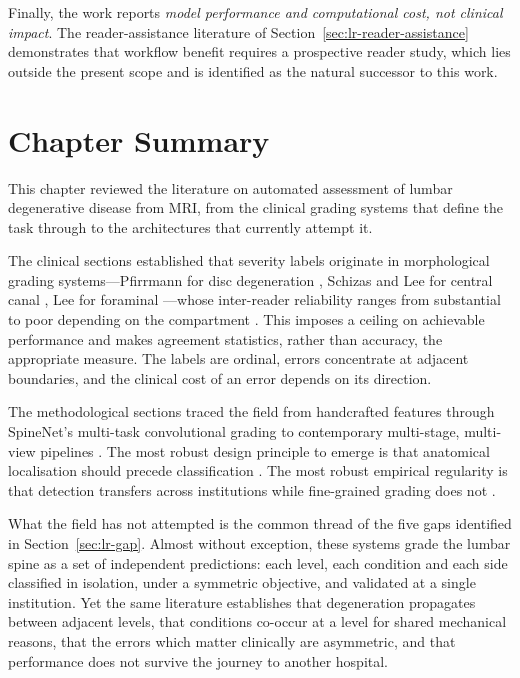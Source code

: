Finally, the work reports \emph{model performance and computational cost, not
clinical impact}. The reader-assistance literature of
Section~\ref{sec:lr-reader-assistance} \cite{lim2022improved,gao2022automatic}
demonstrates that workflow benefit requires a prospective reader study, which
lies outside the present scope and is identified as the natural successor to
this work.

\section{Chapter Summary}
\label{sec:lr-summary}

This chapter reviewed the literature on automated assessment of lumbar
degenerative disease from MRI, from the clinical grading systems that define the
task through to the architectures that currently attempt it.

The clinical sections established that severity labels originate in
morphological grading systems---Pfirrmann for disc degeneration
\cite{pfirrmann2001magnetic}, Schizas and Lee for central canal
\cite{schizas2010qualitative,lee2011a}, Lee for foraminal
\cite{lee2010a}---whose inter-reader reliability ranges from substantial to poor
depending on the compartment \cite{lurie2008reliability}. This imposes a ceiling
on achievable performance and makes agreement statistics, rather than accuracy,
the appropriate measure. The labels are ordinal, errors concentrate at adjacent
boundaries, and the clinical cost of an error depends on its direction.

The methodological sections traced the field from handcrafted features through
SpineNet's multi-task convolutional grading \cite{jamaludin2017spinenet} to
contemporary multi-stage, multi-view pipelines \cite{batra2025mscan}. The most
robust design principle to emerge is that anatomical localisation should precede
classification \cite{lu2018deepspine,kowlagi2022a}. The most robust empirical
regularity is that detection transfers across institutions while fine-grained
grading does not \cite{zhang2023deep,wu2026external}.

What the field has not attempted is the common thread of the five gaps
identified in Section~\ref{sec:lr-gap}. Almost without exception, these systems
grade the lumbar spine as a set of independent predictions: each level, each
condition and each side classified in isolation, under a symmetric objective,
and validated at a single institution. Yet the same literature establishes that
degeneration propagates between adjacent levels, that conditions co-occur at a
level for shared mechanical reasons, that the errors which matter clinically are
asymmetric, and that performance does not survive the journey to another
hospital.

